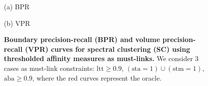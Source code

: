 \begin{figure}[htbp]
\begin{minipage}[t]{1\textwidth}
\footnotesize (a) BPR
\end{minipage}

\begin{minipage}[t]{1\textwidth}
\centering
\hfill \hfill   
{} 
\hfill  
{} 
\hfill 
{} 
\hfill   \hfill

\footnotesize (b) VPR
\end{minipage}

\caption[Boundary precision-recall (BPR) and volume precision-recall (VPR) curves for spectral clustering (SC) using thresholded affinity measures as must-links]{
{\bf Boundary precision-recall (BPR) and volume precision-recall (VPR) curves for spectral clustering (SC) using thresholded affinity measures as must-links.} We consider 3 cases as must-link constraints:
$\mathrm{ltt\geq 0.9}$, $\mathrm{(sta=1)\cup(stm=1)}$, $\mathrm{aba\geq 0.9}$, where the red curves represent the oracle.}
\label{fig:aff_ML}
\end{figure}

